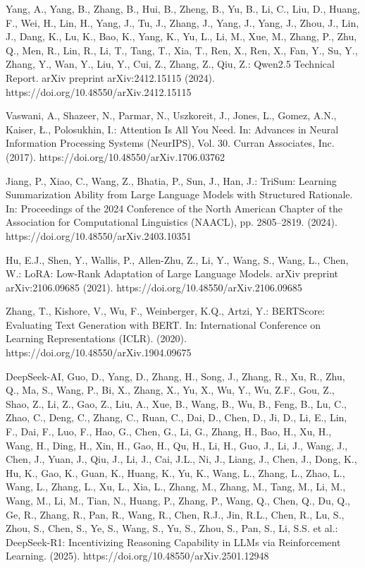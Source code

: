 \documentclass[preprint,12pt]{elsarticle}
\begin{document}
\begin{thebibliography}{11}

  Yang, A., Yang, B., Zhang, B., Hui, B., Zheng, B., Yu, B., Li, C., Liu, D., Huang, F., Wei, H., Lin, H., Yang, J., Tu, J., Zhang, J., Yang, J., Yang, J., Zhou, J., Lin, J., Dang, K., Lu, K., Bao, K., Yang, K., Yu, L., Li, M., Xue, M., Zhang, P., Zhu, Q., Men, R., Lin, R., Li, T., Tang, T., Xia, T., Ren, X., Ren, X., Fan, Y., Su, Y., Zhang, Y., Wan, Y., Liu, Y., Cui, Z., Zhang, Z., Qiu, Z.:
  Qwen2.5 Technical Report.
  arXiv preprint arXiv:2412.15115 (2024).
  https://doi.org/10.48550/arXiv.2412.15115

  Vaswani, A., Shazeer, N., Parmar, N., Uszkoreit, J., Jones, L., Gomez, A.N., Kaiser, Ł., Polosukhin, I.:
  Attention Is All You Need.
  In: Advances in Neural Information Processing Systems (NeurIPS), Vol. 30.
  Curran Associates, Inc. (2017).
  https://doi.org/10.48550/arXiv.1706.03762

  Jiang, P., Xiao, C., Wang, Z., Bhatia, P., Sun, J., Han, J.:
  TriSum: Learning Summarization Ability from Large Language Models with Structured Rationale.
  In: Proceedings of the 2024 Conference of the North American Chapter of the Association for Computational Linguistics (NAACL),
   pp. 2805--2819. (2024).
  https://doi.org/10.48550/arXiv.2403.10351

  Hu, E.J., Shen, Y., Wallis, P., Allen-Zhu, Z., Li, Y., Wang, S., Wang, L., Chen, W.:
  LoRA: Low-Rank Adaptation of Large Language Models.
  arXiv preprint arXiv:2106.09685 (2021).
  https://doi.org/10.48550/arXiv.2106.09685

  Zhang, T., Kishore, V., Wu, F., Weinberger, K.Q., Artzi, Y.:
  BERTScore: Evaluating Text Generation with BERT.
  In: International Conference on Learning Representations (ICLR). (2020).
  https://doi.org/10.48550/arXiv.1904.09675

  DeepSeek-AI, Guo, D., Yang, D., Zhang, H., Song, J., Zhang, R., Xu, R., Zhu, Q., Ma, S., Wang, P., Bi, X., Zhang, X., Yu, X., Wu, Y., Wu, Z.F., Gou, Z., Shao, Z., Li, Z., Gao, Z., Liu, A., Xue, B., Wang, B., Wu, B., Feng, B., Lu, C., Zhao, C., Deng, C., Zhang, C., Ruan, C., Dai, D., Chen, D., Ji, D., Li, E., Lin, F., Dai, F., Luo, F., Hao, G., Chen, G., Li, G., Zhang, H., Bao, H., Xu, H., Wang, H., Ding, H., Xin, H., Gao, H., Qu, H., Li, H., Guo, J., Li, J., Wang, J., Chen, J., Yuan, J., Qiu, J., Li, J., Cai, J.L., Ni, J., Liang, J., Chen, J., Dong, K., Hu, K., Gao, K., Guan, K., Huang, K., Yu, K., Wang, L., Zhang, L., Zhao, L., Wang, L., Zhang, L., Xu, L., Xia, L., Zhang, M., Zhang, M., Tang, M., Li, M., Wang, M., Li, M., Tian, N., Huang, P., Zhang, P., Wang, Q., Chen, Q., Du, Q., Ge, R., Zhang, R., Pan, R., Wang, R., Chen, R.J., Jin, R.L., Chen, R., Lu, S., Zhou, S., Chen, S., Ye, S., Wang, S., Yu, S., Zhou, S., Pan, S., Li, S.S. et al.:
  DeepSeek-R1: Incentivizing Reasoning Capability in LLMs via Reinforcement Learning. (2025).
  https://doi.org/10.48550/arXiv.2501.12948


\end{thebibliography}
\end{document}
